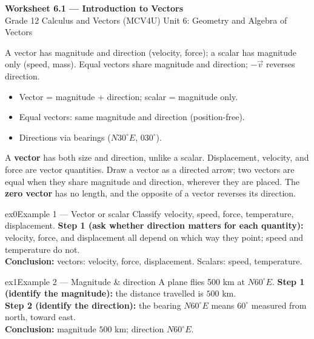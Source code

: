 \documentclass[11pt]{article}
\begin{document}
\begin{center}
{\LARGE\bfseries\color{titleblue}Worksheet 6.1 --- Introduction to Vectors}\\[2pt]
{\small Grade 12 Calculus and Vectors (MCV4U) \textperiodcentered{} Unit 6: Geometry and Algebra of Vectors}
\end{center}

\begin{ideabox}
A vector has magnitude and direction (velocity, force); a scalar has magnitude only (speed, mass). Equal vectors share magnitude and direction; $-\vec v$ reverses direction.
\begin{itemize}[leftmargin=*,itemsep=2pt]
  \item Vector = magnitude + direction; scalar = magnitude only.
  \item Equal vectors: same magnitude and direction (position-free).
  \item Directions via bearings ($N30^\circ E$, $030^\circ$).
\end{itemize}
\end{ideabox}

\begin{learnbox}
A \textbf{vector} has both size and direction, unlike a scalar. Displacement, velocity, and force are vector quantities.
Draw a vector as a directed arrow; two vectors are equal when they share magnitude and direction, wherever they are placed.
The \textbf{zero vector} has no length, and the opposite of a vector reverses its direction.
\end{learnbox}


\begin{example}{ex0}{Example 1 --- Vector or scalar}
Classify velocity, speed, force, temperature, displacement.\soln
\textbf{Step 1 (ask whether direction matters for each quantity):} velocity, force, and displacement all depend on which way they point; speed and temperature do not.\\[3pt]
\textbf{Conclusion:} vectors: velocity, force, displacement. Scalars: speed, temperature.
\end{example}

\begin{example}{ex1}{Example 2 --- Magnitude \& direction}
A plane flies 500 km at $N60^\circ E$.\soln
\textbf{Step 1 (identify the magnitude):} the distance travelled is $500$ km.\\[3pt]
\textbf{Step 2 (identify the direction):} the bearing $N60^\circ E$ means $60^\circ$ measured from north, toward east.\\[3pt]
\textbf{Conclusion:} magnitude $500$ km; direction $N60^\circ E$.
\end{example}
\end{document}
